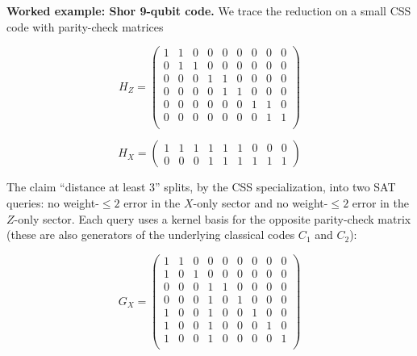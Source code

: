 \begin{mybox}{\textbf{Worked example: Shor 9-qubit code.}}
We trace the reduction on a small
CSS code with parity-check matrices

$$H_Z = \begin{pmatrix}
    1 & 1 & 0 & 0 & 0 & 0 & 0 & 0 & 0  \\
    0 & 1 & 1 & 0 & 0 & 0 & 0 & 0 & 0 \\
    0 & 0 & 0 & 1 & 1 & 0 & 0 & 0 & 0 \\
    0 & 0 & 0 & 0 & 1 & 1 & 0 & 0 & 0\\
    0 & 0 & 0 & 0 & 0 & 0 & 1 & 1 & 0\\
    0 & 0 & 0 & 0 & 0 & 0 & 0 & 1 & 1\\
\end{pmatrix}$$

$$H_X = \begin{pmatrix}
    1 & 1 & 1 & 1 & 1 & 1 & 0 & 0 & 0 \\
    0 & 0 & 0 & 1 & 1 & 1 & 1 & 1 & 1
\end{pmatrix}$$

%

The claim ``distance at least 3'' splits, by the CSS specialization, into two
SAT queries: no weight-$\leq 2$ error in the $X$-only sector and no weight-$\leq
2$ error in the $Z$-only sector. Each query uses a kernel basis for the opposite
parity-check matrix (these are also generators of the underlying classical codes
$C_1$ and $C_2$):

$$G_X = \begin{pmatrix}
    1&1&0&0&0&0&0&0&0\\
1&0&1&0&0&0&0&0&0\\
0&0&0&1&1&0&0&0&0\\
0&0&0&1&0&1&0&0&0\\
1&0&0&1&0&0&1&0&0\\
1&0&0&1&0&0&0&1&0\\
1&0&0&1&0&0&0&0&1\\
\end{pmatrix}$$


\end{mybox}
